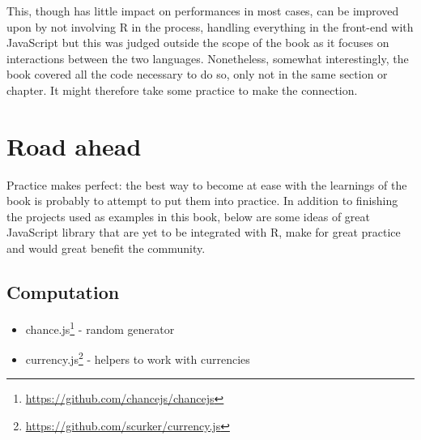 \documentclass[
]{krantz}
\makeatletter
\newenvironment{Shaded}{\begin{snugshade}}{\end{snugshade}}
\newcommand{\AttributeTok}[1]{\textcolor[rgb]{0.61,0.61,0.61}{#1}}
\newcommand{\CommentTok}[1]{\textcolor[rgb]{0.37,0.37,0.37}{\textit{#1}}}
\newcommand{\KeywordTok}[1]{\textcolor[rgb]{0.27,0.27,0.27}{\textbf{#1}}}
\newcommand{\NormalTok}[1]{#1}
\newcommand{\OperatorTok}[1]{\textcolor[rgb]{0.43,0.43,0.43}{\textbf{#1}}}
\newcommand{\StringTok}[1]{\textcolor[rgb]{0.5,0.5,0.5}{#1}}
\providecommand{\tightlist}{%
  \setlength{\itemsep}{0pt}\setlength{\parskip}{0pt}}
\renewcommand{\href}[2]{#2\footnote{\url{#1}}}
\newenvironment{kframe}{%
\medskip{}
\setlength{\fboxsep}{.8em}
 \def\at@end@of@kframe{}%
 \ifinner\ifhmode%
  \def\at@end@of@kframe{\end{minipage}}%
  \begin{minipage}{\columnwidth}%
 \fi\fi%
 \def\FrameCommand##1{\hskip\@totalleftmargin \hskip-\fboxsep
 \colorbox{shadecolor}{##1}\hskip-\fboxsep
     \hskip-\linewidth \hskip-\@totalleftmargin \hskip\columnwidth}%
 \MakeFramed {\advance\hsize-\width
   \@totalleftmargin\z@ \linewidth\hsize
   \@setminipage}}%
 {\par\unskip\endMakeFramed%
 \at@end@of@kframe}
\renewenvironment{Shaded}{\begin{kframe}}{\end{kframe}}
\makeatother
\begin{document}
This, though has little impact on performances in most cases, can be improved upon by not involving R in the process, handling everything in the front-end with JavaScript but this was judged outside the scope of the book as it focuses on interactions between the two languages. Nonetheless, somewhat interestingly, the book covered all the code necessary to do so, only not in the same section or chapter. It might therefore take some practice to make the connection.

\begin{Shaded}
\end{Shaded}

\hypertarget{road-ahead}{%
\section{Road ahead}\label{road-ahead}}

Practice makes perfect: the best way to become at ease with the learnings of the book is probably to attempt to put them into practice. In addition to finishing the projects used as examples in this book, below are some ideas of great JavaScript library that are yet to be integrated with R, make for great practice and would great benefit the community.

\hypertarget{computation}{%
\subsection{Computation}\label{computation}}

\begin{itemize}
\tightlist
\item
  \href{https://github.com/chancejs/chancejs}{chance.js} - random generator
\item
  \href{https://github.com/scurker/currency.js}{currency.js} - helpers to work with currencies
\end{itemize}
\end{document}
